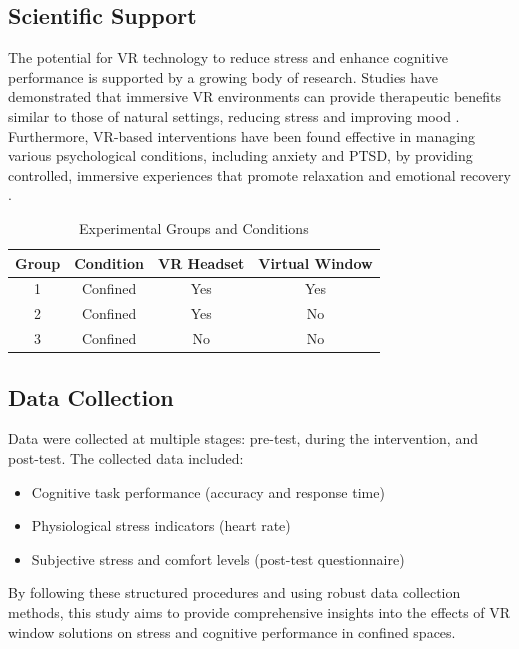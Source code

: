 \documentclass[runningheads]{llncs}
\begin{document}
\subsection{Scientific Support}

The potential for VR technology to reduce stress and enhance cognitive performance is supported by a growing body of research. Studies have demonstrated that immersive VR environments can provide therapeutic benefits similar to those of natural settings, reducing stress and improving mood \cite{valchanov2010}. Furthermore, VR-based interventions have been found effective in managing various psychological conditions, including anxiety and PTSD, by providing controlled, immersive experiences that promote relaxation and emotional recovery \cite{riva2020}.

\begin{table}[h]
\centering
\begin{tabular}{|c|c|c|c|}
\hline
\textbf{Group} & \textbf{Condition} & \textbf{VR Headset} & \textbf{Virtual Window} \\ \hline
1              & Confined           & Yes                 & Yes                     \\ \hline
2              & Confined           & Yes                 & No                      \\ \hline
3              & Confined           & No                  & No                      \\ \hline
\end{tabular}
\caption{Experimental Groups and Conditions}
\label{tab:groups}
\end{table}

\subsection{Data Collection}

Data were collected at multiple stages: pre-test, during the intervention, and post-test. The collected data included:

\begin{itemize}
    \item Cognitive task performance (accuracy and response time)
    \item Physiological stress indicators (heart rate)
    \item Subjective stress and comfort levels (post-test questionnaire)
\end{itemize}

By following these structured procedures and using robust data collection methods, this study aims to provide comprehensive insights into the effects of VR window solutions on stress and cognitive performance in confined spaces.
\end{document}
